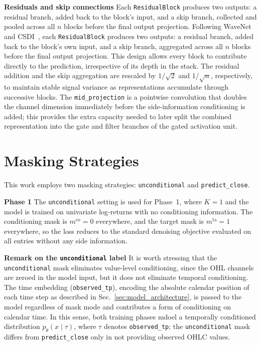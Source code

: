 \textbf{Residuals and skip connections} \quad Each \texttt{ResidualBlock} produces two outputs: a residual branch, added back to the block's input, and a skip branch, collected and pooled across all \(n\) blocks before the final output projection. Following WaveNet\ \cite{oord2016wavenet} and CSDI\ \cite{tashiro2021csdi}, each \texttt{ResidualBlock} produces two outputs: a residual branch, added back to the block's own input, and a skip branch, aggregated across all \(n\) blocks before the final output projection. This design allows every block to contribute directly to the prediction, irrespective of its depth in the stack. The residual addition and the skip aggregation are rescaled by \(1/\sqrt{2}\) and \(1/\sqrt{n}\), respectively, to maintain stable signal variance as representations accumulate through successive blocks. The \texttt{mid\_projection} is a pointwise convolution that doubles the channel dimension immediately before the side-information conditioning is added; this provides the extra capacity needed to later split the combined representation into the gate and filter branches of the gated activation unit.

\section{Masking Strategies}
\label{sec:masking_strategies_ch3}
This work employs two masking strategies: \texttt{unconditional} and \texttt{predict\_close}.

\textbf{Phase 1} \quad The \texttt{unconditional} setting is used for Phase~1, where \(K=1\) and the model is trained on
univariate log-returns with no conditioning information. The conditioning
mask is \(m^{\text{co}}=0\) everywhere, and the target mask is
\(m^{\text{ta}}=1\) everywhere, so the loss reduces to the
standard denoising objective evaluated on all entries without any side information.

\textbf{Remark on the \texttt{unconditional} label} \quad It is worth stressing that the \texttt{unconditional} mask eliminates value-level conditioning, since the OHL channels are zeroed in the model input, but it does not eliminate temporal conditioning. The time embedding (\texttt{observed\_tp}), encoding the absolute calendar position of each time step as described in Sec.\ \ref{sec:model_architecture}, is passed to the model regardless of mask mode and contributes a form of conditioning on calendar time. In this sense, both training phases mdoel a temporally conditioned distribution \(p_\theta(x \mid \tau)\), where \(\tau\) denotes \texttt{observed\_tp}; the \texttt{unconditional} mask differs from \texttt{predict\_close} only in not providing observed OHLC values.

